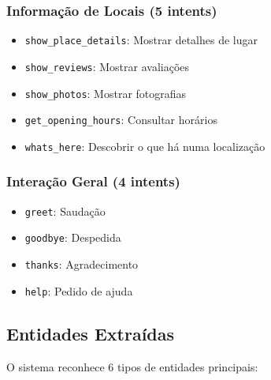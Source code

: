 \subsubsection{Informação de Locais (5 intents)}
\begin{itemize}
    \item \texttt{show\_place\_details}: Mostrar detalhes de lugar
    \item \texttt{show\_reviews}: Mostrar avaliações
    \item \texttt{show\_photos}: Mostrar fotografias
    \item \texttt{get\_opening\_hours}: Consultar horários
    \item \texttt{whats\_here}: Descobrir o que há numa localização
\end{itemize}

\subsubsection{Interação Geral (4 intents)}
\begin{itemize}
    \item \texttt{greet}: Saudação
    \item \texttt{goodbye}: Despedida
    \item \texttt{thanks}: Agradecimento
    \item \texttt{help}: Pedido de ajuda
\end{itemize}

\subsection{Entidades Extraídas}

O sistema reconhece 6 tipos de entidades principais:

